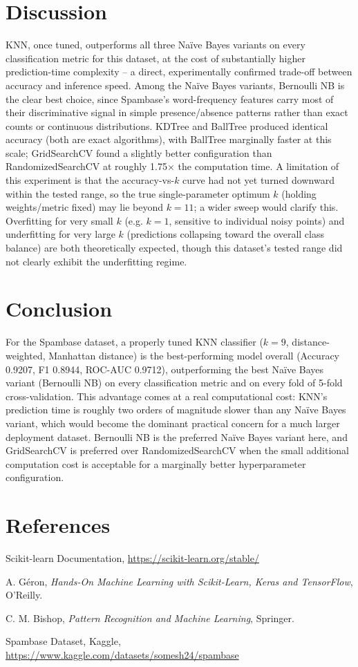 \documentclass[12pt,a4paper]{article}
\begin{document}
\section{Discussion}
KNN, once tuned, outperforms all three Na\"ive Bayes variants on every classification metric
for this dataset, at the cost of substantially higher prediction-time complexity -- a direct,
experimentally confirmed trade-off between accuracy and inference speed. Among the Na\"ive
Bayes variants, Bernoulli NB is the clear best choice, since Spambase's word-frequency
features carry most of their discriminative signal in simple presence/absence patterns
rather than exact counts or continuous distributions. KDTree and BallTree produced identical
accuracy (both are exact algorithms), with BallTree marginally faster at this scale;
GridSearchCV found a slightly better configuration than RandomizedSearchCV at roughly
1.75$\times$ the computation time. A limitation of this experiment is that the accuracy-vs-$k$
curve had not yet turned downward within the tested range, so the true single-parameter
optimum $k$ (holding weights/metric fixed) may lie beyond $k=11$; a wider sweep would clarify
this. Overfitting for very small $k$ (e.g. $k=1$, sensitive to individual noisy points) and
underfitting for very large $k$ (predictions collapsing toward the overall class balance) are
both theoretically expected, though this dataset's tested range did not clearly exhibit the
underfitting regime.

\section{Conclusion}
For the Spambase dataset, a properly tuned KNN classifier ($k=9$, distance-weighted, Manhattan
distance) is the best-performing model overall (Accuracy 0.9207, F1 0.8944, ROC-AUC 0.9712),
outperforming the best Na\"ive Bayes variant (Bernoulli NB) on every classification metric and
on every fold of 5-fold cross-validation. This advantage comes at a real computational cost:
KNN's prediction time is roughly two orders of magnitude slower than any Na\"ive Bayes
variant, which would become the dominant practical concern for a much larger deployment
dataset. Bernoulli NB is the preferred Na\"ive Bayes variant here, and GridSearchCV is
preferred over RandomizedSearchCV when the small additional computation cost is acceptable
for a marginally better hyperparameter configuration.

\section{References}
\begin{enumerate}[label={[\arabic*]}]
\item Scikit-learn Documentation, \url{https://scikit-learn.org/stable/}
\item A. G\'eron, \textit{Hands-On Machine Learning with Scikit-Learn, Keras and TensorFlow}, O'Reilly.
\item C. M. Bishop, \textit{Pattern Recognition and Machine Learning}, Springer.
\item Spambase Dataset, Kaggle, \url{https://www.kaggle.com/datasets/somesh24/spambase}
\end{enumerate}
\end{document}
